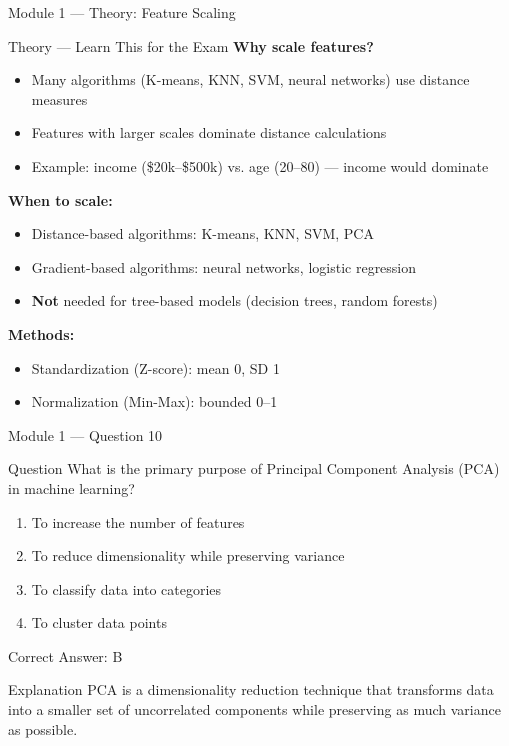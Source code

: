 \documentclass[aspectratio=169,10pt]{beamer}
\newcommand{\question}[1]{%
	\begin{block}{Question}
		#1
	\end{block}
}
\newcommand{\options}[4]{%
	\begin{enumerate}[label=\Alph*.,leftmargin=*]
		\item #1
		\item #2
		\item #3
		\item #4
	\end{enumerate}
}
\newcommand{\answerbox}[1]{%
	\begin{exampleblock}{Correct Answer: #1}
	\end{exampleblock}
}
\newcommand{\explain}[1]{%
	\begin{block}{Explanation}
		\small #1
	\end{block}
}
\newcommand{\theory}[1]{%
	\begin{block}{Theory --- Learn This for the Exam}
		\small #1
	\end{block}
}
\begin{document}
	\begin{frame}{Module 1 --- Theory: Feature Scaling}
		\theory{
			\textbf{Why scale features?}
			\begin{itemize}
				\item Many algorithms (K-means, KNN, SVM, neural networks) use distance measures
				\item Features with larger scales dominate distance calculations
				\item Example: income (\$20k--\$500k) vs. age (20--80) --- income would dominate
			\end{itemize}
			\textbf{When to scale:}
			\begin{itemize}
				\item Distance-based algorithms: K-means, KNN, SVM, PCA
				\item Gradient-based algorithms: neural networks, logistic regression
				\item \textbf{Not} needed for tree-based models (decision trees, random forests)
			\end{itemize}
			\textbf{Methods:}
			\begin{itemize}
				\item Standardization (Z-score): mean 0, SD 1
				\item Normalization (Min-Max): bounded 0--1
			\end{itemize}
		}
	\end{frame}
	
	\begin{frame}{Module 1 --- Question 10}
		\question{What is the primary purpose of Principal Component Analysis (PCA) in machine learning?}
		\options{To increase the number of features}{To reduce dimensionality while preserving variance}{To classify data into categories}{To cluster data points}
		\answerbox{B}
		\explain{PCA is a dimensionality reduction technique that transforms data into a smaller set of uncorrelated components while preserving as much variance as possible.}
	\end{frame}
	
\end{document}
